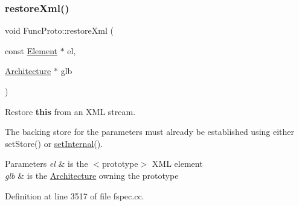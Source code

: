 \subsubsection{\texorpdfstring{restoreXml()}{restoreXml()}}
{\footnotesize\ttfamily void Func\+Proto\+::restore\+Xml (\begin{DoxyParamCaption}\item[{const \mbox{\hyperlink{class_element}{Element}} $\ast$}]{el,  }\item[{\mbox{\hyperlink{class_architecture}{Architecture}} $\ast$}]{glb }\end{DoxyParamCaption})}



Restore {\bfseries{this}} from an X\+ML stream. 

The backing store for the parameters must already be established using either set\+Store() or \mbox{\hyperlink{class_func_proto_af69f89b0b3c5165e521d33b658599699}{set\+Internal()}}. 
\begin{DoxyParams}{Parameters}
{\em el} & is the $<$prototype$>$ X\+ML element \\
\hline
{\em glb} & is the \mbox{\hyperlink{class_architecture}{Architecture}} owning the prototype \\
\hline
\end{DoxyParams}


Definition at line 3517 of file fspec.\+cc.


